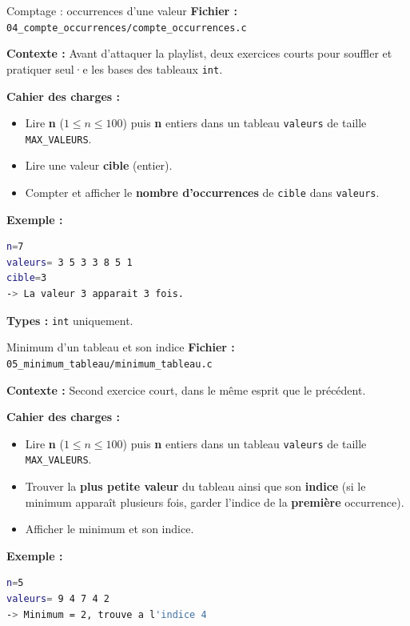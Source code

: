 \begin{UPSTIManipulation}{Comptage : occurrences d'une valeur}
  \textbf{Fichier :} \texttt{04\_compte\_occurrences/compte\_occurrences.c}

  \textbf{Contexte :} Avant d'attaquer la playlist, deux exercices courts pour souffler et pratiquer seul·e les bases des tableaux \texttt{int}.

  \textbf{Cahier des charges :}
  \begin{itemize}
    \item Lire \textbf{n} ($1\le n \le 100$) puis \textbf{n} entiers dans un tableau \texttt{valeurs} de taille \texttt{MAX\_VALEURS}.
    \item Lire une valeur \textbf{cible} (entier).
    \item Compter et afficher le \textbf{nombre d'occurrences} de \texttt{cible} dans \texttt{valeurs}.
  \end{itemize}

  \textbf{Exemple :}
  \begin{lstlisting}[language=bash]
n=7
valeurs= 3 5 3 3 8 5 1
cible=3
-> La valeur 3 apparait 3 fois.
  \end{lstlisting}

  \textbf{Types :} \texttt{int} uniquement.

\end{UPSTIManipulation}


\begin{UPSTIManipulation}{Minimum d'un tableau et son indice}
  \textbf{Fichier :} \texttt{05\_minimum\_tableau/minimum\_tableau.c}

  \textbf{Contexte :} Second exercice court, dans le même esprit que le précédent.

  \textbf{Cahier des charges :}
  \begin{itemize}
    \item Lire \textbf{n} ($1\le n \le 100$) puis \textbf{n} entiers dans un tableau \texttt{valeurs} de taille \texttt{MAX\_VALEURS}.
    \item Trouver la \textbf{plus petite valeur} du tableau ainsi que son \textbf{indice} (si le minimum apparaît plusieurs fois, garder l'indice de la \textbf{première} occurrence).
    \item Afficher le minimum et son indice.
  \end{itemize}

  \textbf{Exemple :}
  \begin{lstlisting}[language=bash]
n=5
valeurs= 9 4 7 4 2
-> Minimum = 2, trouve a l'indice 4
  \end{lstlisting}

\end{UPSTIManipulation}



